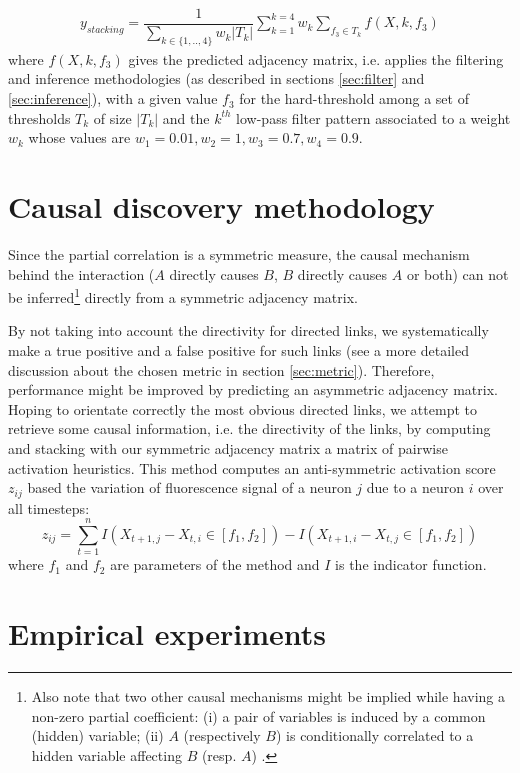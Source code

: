 \documentclass[wcp]{jmlr}
\begin{document}
\begin{align}
y_{stacking} =  \dfrac{1}{\sum_{k\in\{1,..,4\}} w_k |T_k|} \sum_{k=1}^{k=4}  w_k \sum_{f_3 \in T_k} f(X, k, f_3)
\end{align}
where $f(X, k, f_3)$ gives the predicted adjacency matrix, i.e. applies the filtering and inference methodologies (as described
in sections \ref{sec:filter} and \ref{sec:inference}), with a  given value $f_3$ for the
hard-threshold among a set of thresholds $T_k$ of size $|T_k|$ and the $k^{th}$ low-pass filter pattern associated
to a weight $w_k$ whose values are $w_1 = 0.01 , w_2 =1, w_3 = 0.7, w_4 = 0.9$.

\section{Causal discovery methodology}
Since the partial correlation is a symmetric measure, the causal mechanism behind the
interaction ($A$ directly causes $B$, $B$ directly causes $A$ or both) can not
be inferred\footnote{Also note that two other causal mechanisms might be
implied while having a non-zero partial coefficient: (i) a pair of variables
is induced by a common (hidden) variable; (ii) $A$ (respectively $B$) is
conditionally correlated to a hidden variable affecting $B$ (resp. $A$)
\cite{de2004discovery}.} directly from a symmetric adjacency matrix.

By not taking into account the directivity for directed links, we systematically
make a true positive and a false positive for such links (see a more detailed
discussion about the chosen metric in section \ref{sec:metric}). Therefore,
performance might be improved by predicting an asymmetric adjacency matrix.
Hoping to orientate correctly the most obvious directed links, we attempt to
retrieve some causal information, i.e. the directivity of the links, by computing
and stacking with our symmetric adjacency matrix a matrix of pairwise activation
heuristics. This method computes an anti-symmetric activation score $z_{ij}$
based the variation of fluorescence signal of a neuron $j$ due to a neuron $i$
over all timesteps:
\[
z_{ij} = \sum_{t=1}^n I(X_{t+1,j} - X_{t, i} \in [f_1, f_2]) -  I(X_{t+1,i} - X_{t, j} \in [f_1, f_2])
\]
where $f_1$ and $f_2$ are parameters of the method and $I$ is the
indicator function. %


\section{Empirical experiments}
\end{document}
